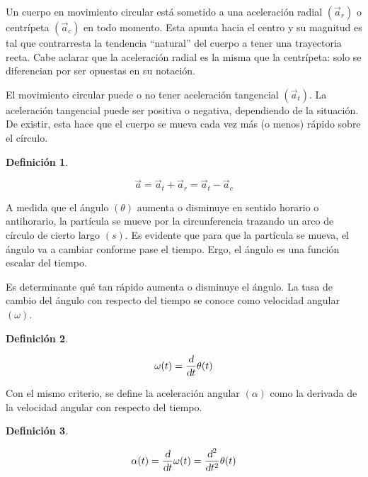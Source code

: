 \documentclass[a5paper,12pt,twoside]{book}
\newtheorem{defn}{{Definición}}[chapter]
\begin{document}
Un cuerpo en movimiento circular está sometido a una aceleración radial $(\vec{a}_r)$ o centrípeta $(\Vec{a}_c)$ en todo momento. Esta apunta hacia el centro y su magnitud es tal que contrarresta la tendencia ``natural'' del cuerpo a tener una trayectoria recta. Cabe aclarar que la aceleración radial es la misma que la centrípeta: solo se diferencian por ser opuestas en su notación.

El movimiento circular puede o no tener aceleración tangencial $(\Vec{a}_ t)$. La aceleración tangencial puede ser positiva o negativa, dependiendo de la situación. De existir, esta hace que el cuerpo se mueva cada vez más (o menos) rápido sobre el círculo.

\begin{mdframed}[style=MyFrame1]
    \begin{defn}
    \end{defn}
    \begin{equation*}
        \Vec{a} = \Vec{a}_t + \Vec{a}_r = \Vec{a}_t - \Vec{a}_c
    \end{equation*}
\end{mdframed}

A medida que el ángulo $(\theta)$ aumenta o disminuye en sentido horario o antihorario, la partícula se mueve por la circunferencia trazando un arco de círculo de cierto largo $(s)$. Es evidente que para que la partícula se mueva, el ángulo va a cambiar conforme pase el tiempo. Ergo, el ángulo es una función escalar del tiempo.

Es determinante qué tan rápido aumenta o disminuye el ángulo. La tasa de cambio del ángulo con respecto del tiempo se conoce como velocidad angular $(\omega)$.

\begin{mdframed}[style=MyFrame1]
    \begin{defn}
        \label{defn:angularVel}
    \end{defn}
    \begin{equation*}
        \omega (t) = \dfrac{\textsl{d}}{\textsl{d} t} \theta (t)
    \end{equation*}
\end{mdframed}

Con el mismo criterio, se define la aceleración angular $(\alpha)$ como la derivada de la velocidad angular con respecto del tiempo.

\begin{mdframed}[style=MyFrame1]
    \begin{defn}
        \label{defn:angularAccel}
    \end{defn}
    \begin{equation*}
        \alpha (t) = \dfrac{\textsl{d}}{\textsl{d} t} \omega (t) = \dfrac{\textsl{d}^2}{\textsl{d} t^2} \theta (t)
    \end{equation*}
\end{mdframed}
\end{document}
